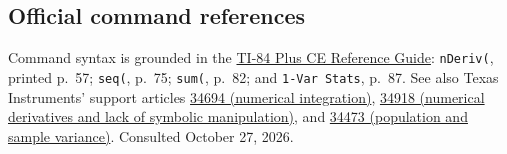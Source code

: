 \subsection{Official command references}
Command syntax is grounded in the \href{https://education.ti.com/download/en/ed-tech/0E32ECD55D084B2EAE7632510BC25FC0/4C0D8E4ED84C4182BC94F8375DEC4E0A/TI84_Plus_CE_ReferenceGuide_EN_GB.pdf}{TI-84 Plus CE Reference Guide}: \texttt{nDeriv(}, printed p.~57; \texttt{seq(}, p.~75; \texttt{sum(}, p.~82; and \texttt{1-Var Stats}, p.~87. See also Texas Instruments' support articles \href{https://education.ti.com/en/customer-support/knowledge-base/ti-83-84-plus-family/product-usage/34694}{34694 (numerical integration)}, \href{https://education.ti.com/en/customer-support/knowledge-base/ti-83-84-plus-family/product-usage/34918}{34918 (numerical derivatives and lack of symbolic manipulation)}, and \href{https://education.ti.com/en/customer-support/knowledge-base/ti-83-84-plus-family/product-usage/34473}{34473 (population and sample variance)}. Consulted October 27, 2026.
